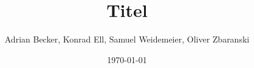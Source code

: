 \documentclass[aspectratio=1610]{beamer}
\title[Titel in Kurzform]{Titel}
\author[A. Becker, K. Ell, S. Weidemeier, O. Zbaranski]{Adrian Becker, Konrad Ell, Samuel Weidemeier, Oliver Zbaranski}
\date{\today}
\begin{document}
\frame{\titlepage}


\begin{frame}[t]{}

\end{frame}
\end{document}
